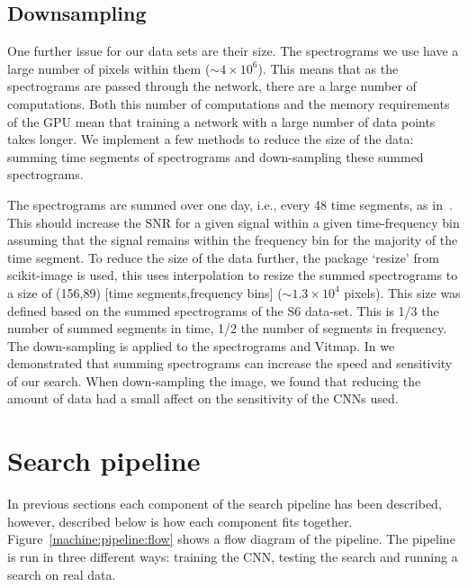 \subsection{\label{machine:data:downsample} Downsampling}

%
One further issue for our data sets are their size. The spectrograms we use have a large number of pixels within them ($\sim 4 \times 10^{6}$).
This means that as the spectrograms are passed through the network, there are a large number of computations.
Both this number of computations and the memory requirements of the GPU mean that training a network with a large number of data points takes longer.
We implement a few methods to reduce the size of the data: summing time segments of
spectrograms and down-sampling these summed spectrograms.  

%
The spectrograms are summed over one day, i.e., every 48 time segments, as
in~\cite{bayley2019SOAPGeneralised}. This should increase the \gls{SNR} for a
given signal within a given time-frequency bin assuming that the
signal remains within the frequency bin for the majority of the time segment.
To reduce the size of the data further, the package `resize' from scikit-image
\cite{vanderwalt2014ScikitimageImage} is used, this uses interpolation to
resize the summed spectrograms to a size of (156,89) [time segments,frequency
bins] ($\sim 1.3 \times 10^{4}$ pixels). This size was defined based on the summed spectrograms of the S6 data-set. This is 1/3 the number of summed segments in time, 1/2 the number of segments in frequency. The down-sampling is applied to the
spectrograms and Vitmap. 
In \cite{bayley2019SOAPGeneralised} we demonstrated that summing spectrograms can increase the speed and sensitivity of our search.
When down-sampling the image, we found that reducing the amount of data had a small affect on the sensitivity of the \glspl{CNN} used.

\section{\label{machine:pipeline}Search pipeline}

%
In previous sections each component of the search pipeline has been described,
however, described below is how each component fits together.
Figure~\ref{machine:pipeline:flow} shows a flow diagram of the pipeline. The pipeline is
run in three different ways: training the \gls{CNN}, testing the search and
running a search on real data. 

